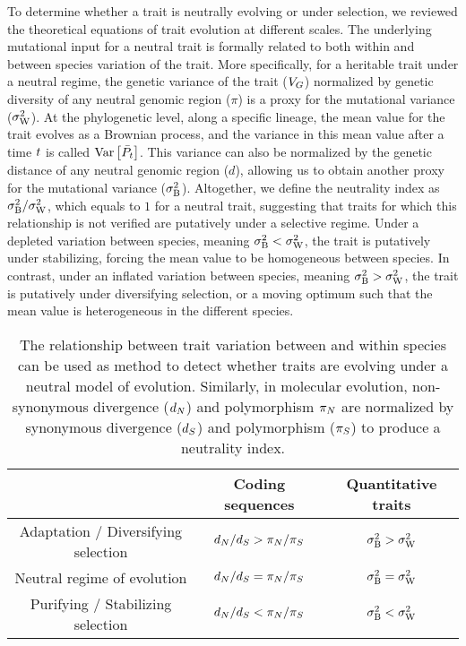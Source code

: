 \documentclass{article}
\begin{document}
To determine whether a trait is neutrally evolving or under selection, we reviewed the theoretical equations of trait evolution at different scales.
The underlying mutational input for a neutral trait is formally related to both within and between species variation of the trait.
More specifically, for a heritable trait under a neutral regime, the genetic variance of the trait ($V_{G}$) normalized by genetic diversity of any neutral genomic region ($\pi$) is a proxy for the mutational variance ($\sigma^2_{\text{W}}$).
At the phylogenetic level, along a specific lineage, the mean value for the trait evolves as a Brownian process, and the variance in this mean value after a time $t$ is called $\operatorname{\text{Var}} \left[\bar{P_{t}}\right]$.
This variance can also be normalized by the genetic distance of any neutral genomic region ($d$), allowing us to obtain another proxy for the mutational variance ($\sigma^2_{\text{B}}$).
Altogether, we define the neutrality index as $\sigma^2_{\text{B}}/\sigma^2_{\text{W}}$, which equals to $1$ for a neutral trait, suggesting that traits for which this relationship is not verified are putatively under a selective regime.
Under a depleted variation between species, meaning $\sigma^2_{\text{B}} < \sigma^2_{\text{W}}$, the trait is putatively under stabilizing, forcing the mean value to be homogeneous between species.
In contrast, under an inflated variation between species, meaning $\sigma^2_{\text{B}} > \sigma^2_{\text{W}}$, the trait is putatively under diversifying selection, or a moving optimum such that the mean value is heterogeneous in the different species.

\begin{table*}[t!]
    \centering
    \begin{adjustbox}{width = 0.5\textwidth}
    \begin{tabular}{|c||c|c|}
            \hline
            & Coding sequences & Quantitative traits \\ \hline \hline
            Adaptation / Diversifying selection & $d_N / d_S > \pi_N / \pi_S$ & $ \sigma^2_{\text{B}} > \sigma^2_{\text{W}}  $ \\ \hline
            Neutral regime of evolution & $d_N / d_S = \pi_N / \pi_S$ & $ \sigma^2_{\text{B}} = \sigma^2_{\text{W}}  $ \\ \hline
            Purifying / Stabilizing selection & $d_N / d_S < \pi_N / \pi_S$ & $ \sigma^2_{\text{B}} < \sigma^2_{\text{W}}  $ \\ \hline
    \end{tabular}
    \end{adjustbox}
    \caption{
        The relationship between trait variation between and within species can be used as method to detect whether traits are evolving under a neutral model of evolution.
        Similarly, in molecular evolution, non-synonymous divergence ($d_N$) and polymorphism $\pi_N$ are normalized by synonymous divergence ($d_S$) and polymorphism ($\pi_S$) to produce a neutrality index\cite{mcdonald_adaptative_1991, fay_evaluating_2008}.
    }
    \label{table:unfolded-MK}
\end{table*}
\end{document}
